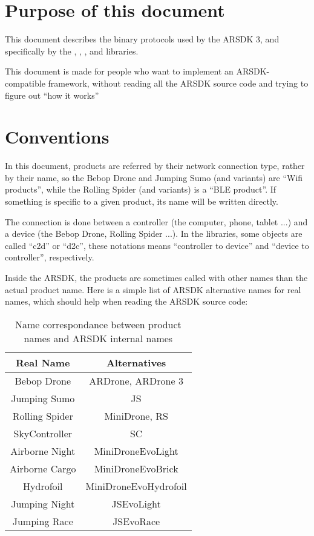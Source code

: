 \section*{Purpose of this document}

This document describes the binary protocols used by the ARSDK 3, and specifically by the , , ,  and  libraries.


This document is made for people who want to implement an ARSDK-compatible framework, without reading all the ARSDK source code and trying to figure out ``how it works''

\section*{Conventions}

In this document, products are referred by their network connection type, rather by their name, so the Bebop Drone and Jumping Sumo (and variants) are ``Wifi products'', while the Rolling Spider (and variants) is a ``BLE product''. If something is specific to a given product, its name will be written directly.

The connection is done between a controller (the computer, phone, tablet ...) and a device (the Bebop Drone, Rolling Spider ...). In the libraries, some objects are called ``c2d'' or ``d2c'', these notations means ``controller to device'' and ``device to controller'', respectively.

Inside the ARSDK, the products are sometimes called with other names than the actual product name. Here is a simple list of ARSDK alternative names for real names, which should help when reading the ARSDK source code:

\begin{table}[h]
\centering
\begin{tabular}{|c|c|}
  \hline
  Real Name & Alternatives \\
  \hline
  \hline
  Bebop Drone & ARDrone, ARDrone 3 \\
  \hline
  Jumping Sumo & JS \\
  \hline
  Rolling Spider & MiniDrone, RS \\
  \hline
  SkyController & SC \\
  \hline
  Airborne Night & MiniDroneEvoLight \\
  \hline
  Airborne Cargo & MiniDroneEvoBrick \\
  \hline
  Hydrofoil & MiniDroneEvoHydrofoil \\
  \hline
  Jumping Night & JSEvoLight \\
  \hline
  Jumping Race & JSEvoRace \\
  \hline
\end{tabular}
\caption{Name correspondance between product names and ARSDK internal names}
\end{table}

